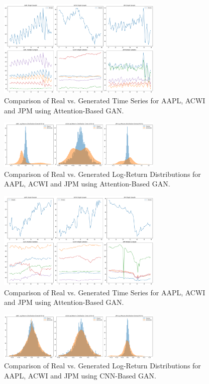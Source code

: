 \documentclass{article}
\begin{document}
\begin{figure}[h!]
    \centering
    \includegraphics[width=0.7\textwidth]{attention_gen_samples}
    \caption{Comparison of Real vs. Generated Time Series for AAPL, ACWI and JPM using Attention-Based GAN.}
    \label{fig:attention_comparison}
\end{figure}

\begin{figure}[h!]
    \centering
    \includegraphics[width=0.7\textwidth]{attention_distributions}
    \caption{Comparison of Real vs. Generated Log-Return Distributions for AAPL, ACWI and JPM using Attention-Based GAN.}
    \label{fig:attention_comparison}
\end{figure}

\begin{figure}[h!]
    \centering
    \includegraphics[width=0.7\textwidth]{CNN_gen_samples}
    \caption{Comparison of Real vs. Generated Time Series for AAPL, ACWI and JPM using Attention-Based GAN.}
    \label{fig:attention_comparison}
\end{figure}

\begin{figure}[h!]
    \centering
    \includegraphics[width=0.7\textwidth]{cnn_distributions}
    \caption{Comparison of Real vs. Generated Log-Return Distributions for AAPL, ACWI and JPM using CNN-Based GAN.}
    \label{fig:attention_comparison}
\end{figure}
\end{document}
